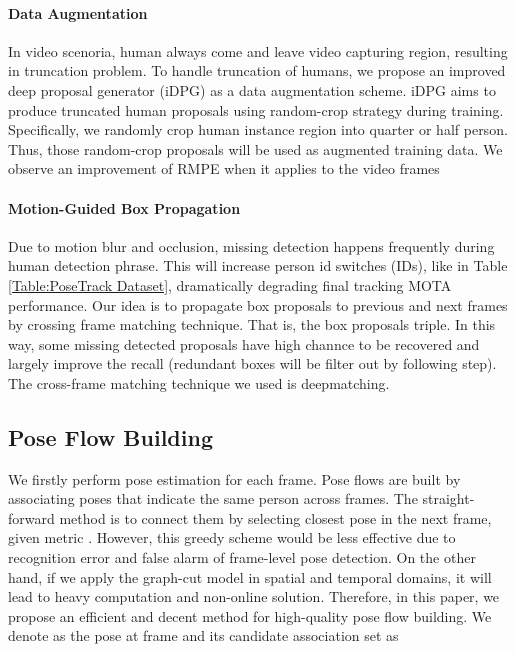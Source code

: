 \documentclass{bmvc2k}
\begin{document}
\paragraph{Data Augmentation} 
In video scenoria, human always come and leave video capturing region, resulting in truncation problem. To handle truncation of humans, we propose an improved deep proposal generator (iDPG) as a data augmentation scheme. iDPG aims to produce truncated human proposals using random-crop strategy during training. Specifically, we randomly crop human instance region into quarter or half person. Thus, those random-crop proposals will be used as augmented training data. We observe an improvement of RMPE when it applies to the video frames 
\vspace{-4mm}
\paragraph{Motion-Guided Box Propagation} Due to motion blur and occlusion, missing detection happens frequently during human detection phrase. This will increase person id switches (IDs), like in Table \ref{Table:PoseTrack Dataset},  dramatically degrading final tracking MOTA performance. Our idea is to propagate box proposals to previous and next frames by crossing frame matching technique. That is, the box proposals triple. In this way, some missing detected proposals have high channce to be recovered and largely improve the recall (redundant boxes will be filter out by following step). The cross-frame matching technique we used is deepmatching\cite{revaud2016deepmatching}.
\vspace{-3mm}
\subsection{Pose Flow Building}
We firstly perform pose estimation for each frame. Pose flows are built by associating poses that indicate the same person across frames. The straight-forward method is to connect them by selecting closest pose in the next frame, given metric . However, this greedy scheme would be less effective due to recognition error and false alarm of frame-level pose detection. On the other hand, if we apply the graph-cut model in spatial and temporal domains, it will lead to heavy computation and non-online solution. Therefore, in this paper, we propose an efficient and decent method for high-quality pose flow building. We denote  as the  pose at  frame and its candidate association set as
\vspace{-1mm}
\end{document}
